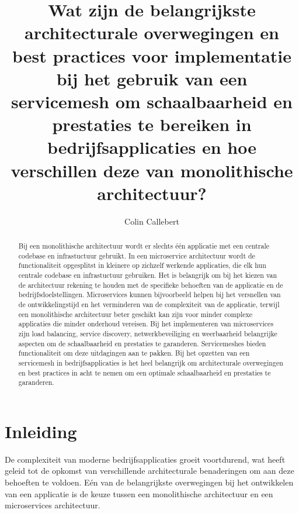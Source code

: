 \documentclass{hogent-article}
\title{Wat zijn de belangrijkste architecturale overwegingen en best practices voor implementatie bij het gebruik van een servicemesh om schaalbaarheid en prestaties te bereiken in bedrijfsapplicaties en hoe verschillen deze van monolithische architectuur?}
\author{Colin Callebert}
\begin{document}
\begin{abstract}
  Bij een monolithische architectuur wordt er slechts één applicatie met een centrale codebase en infrastuctuur gebruikt. In een microservice architectuur wordt de functionaliteit opgesplitst in kleinere op zichzelf werkende applicaties, die elk hun centrale codebase en infrastuctuur gebruiken.
  Het is belangrijk om bij het kiezen van de architectuur rekening te houden met de specifieke behoeften van de applicatie en de bedrijfsdoelstellingen.
  Microservices kunnen bijvoorbeeld helpen bij het versnellen van de ontwikkelingstijd en het verminderen van de complexiteit van de applicatie, terwijl een monolithische architectuur beter geschikt kan zijn voor minder complexe applicaties die minder onderhoud vereisen.
  Bij het implementeren van microservices zijn load balancing, service discovery, netwerkbeveiliging en weerbaarheid belangrijke aspecten om de schaalbaarheid en prestaties te garanderen. Servicemeshes bieden functionaliteit om deze uitdagingen aan te pakken.
  Bij het opzetten van een servicemesh in bedrijfsapplicaties is het heel belangrijk om architecturale overwegingen en best practices in acht te nemen om een optimale schaalbaarheid en prestaties te garanderen.
\end{abstract}

\tableofcontents

\bigskip





\section{Inleiding}%
\label{sec:inleiding}

De complexiteit van moderne bedrijfsapplicaties groeit voortdurend, wat heeft geleid tot de opkomst van verschillende architecturale benaderingen om aan deze behoeften te voldoen. Eén van de belangrijkste overwegingen bij het ontwikkelen van een applicatie is de keuze tussen een monolithische architectuur en een microservices architectuur. 
\end{document}
